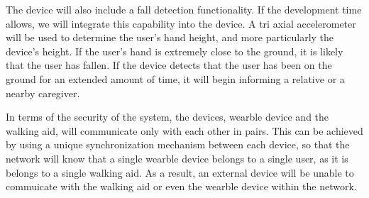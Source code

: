         The device will also include a fall detection functionality. If the development time allows, we will integrate
        this capability into the device. A tri axial accelerometer will be used to determine the user's hand height, and
        more particularly the device's height. If the user's hand is extremely close to the ground, it is likely that
        the user has fallen. If the device detects that the user has been on the ground for an extended amount of time,
        it will begin informing a relative or a nearby caregiver.

        In terms of the security of the system, the devices, wearble device and the walking aid, will communicate only with each other in pairs. This can be achieved by using a unique synchronization mechanism between each device, so that the network will know that a single wearble device belongs to a single user, as it is belongs to a single walking aid. As a result, an external device will be unable to commuicate with the walking aid or even the wearble device within the network.
